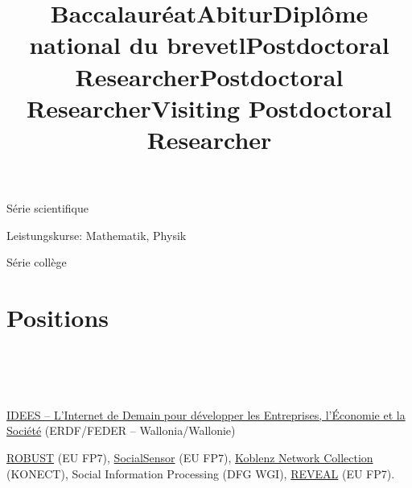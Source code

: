 \documentclass[line,mm]{res}
\newcounter{x}
\begin{document}
\begin{resume}
\title{\bf Baccalauréat}
\begin{position}
  Série scientifique
\end{position}

\title{\bf Abitur}
\begin{position}
  Leistungskurse:  Mathematik, Physik
\end{position}

\title{\bf Diplôme national du brevet}
\begin{position}
  Série collège
\end{position}

\section{Positions}

\begin{format}
\title{l}\\
 \\
\body\\
\end{format}

\title{\bf Postdoctoral Researcher}
\begin{position}
  \href{http://nouvelles.unamur.be/upnews.2015-10-01.8995593781}{IDEES -- L'Internet de Demain pour développer les Entreprises, l'Économie et la Société} (ERDF/FEDER -- Wallonia/Wallonie)
\end{position}

\title{\bf Postdoctoral Researcher}
\begin{position}
  \href{http://www.robust-project.eu/}{ROBUST} (EU FP7), \href{http://www.socialsensor.eu/}{SocialSensor} (EU FP7), \href{http://konect.uni-koblenz.de/}{Koblenz Network Collection} (KONECT), Social Information Processing (DFG WGI), \href{http://revealproject.eu/}{REVEAL} (EU FP7).
\end{position}

\title{\bf Visiting Postdoctoral Researcher}
\begin{position}
\end{position}


\end{resume}
\end{document}
